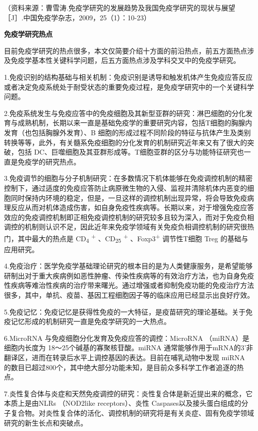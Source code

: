 （资料来源：曹雪涛.免疫学研究的发展趋势及我国免疫学研究的现状与展望［J］.中国免疫学杂志，2009，25（1）：10-23）

\begin{center}
    \textbf{\Large  免疫学研究热点}
\end{center}

目前免疫学研究的热点很多，本文仅简要介绍十方面的前沿热点，前五方面热点涉及免疫学基本性关键科学问题，后五方面热点涉及学科交叉中的免疫学研究。

1.免疫识别的结构基础与相关机制：免疫识别是诱导和触发机体产生免疫应答反应或者决定免疫系统处于耐受状态的重要免疫过程，是免疫学研究中的一个关键科学问题。

2.免疫系统发生与免疫应答中的免疫细胞及其新型亚群的研究：淋巴细胞的分化发育与成熟机制，长期以来一直是基础免疫学的重要研究内容，包括T细胞的胸腺内发育（也包括胸腺外发育）、B
细胞的形成过程不同阶段的特征与抗体产生及类别转换等等，此外，有关髓系免疫细胞的分化发育的机制研究近年来又有了很大的突破，包括
DC、巨噬细胞及其亚群形成等。T细胞亚群的区分与功能特征研究也一直是免疫学的研究热点。

3.免疫调节的细胞与分子机制研究：在多数情况下机体能够在免疫调控机制的精密控制下，通过适度的免疫应答防止病原微生物的入侵、监视并清除机体内恶变的细胞同时保持内环境的稳定，但是，一旦这样的调控机制出现异常，将会导致免疫病理反应从而对机体造成伤害，如自身免疫性疾病等。长期以来，对于增强免疫应答效应的免疫调控机制即正相免疫调控机制的研究较多且较为深入，而对于免疫负相调控的机制则认识不足，因此近年来免疫学领域有关免疫负相调控机制的研究很热门，其中最大的热点是
CD\textsubscript{4} \textsuperscript{+} 、CD\textsubscript{25}
\textsuperscript{+} 、Foxp3\textsuperscript{+} 调节性T细胞 Treg
的基础与应用研究。

4.免疫治疗：医学免疫学基础理论研究的根本目的是为人类健康服务，是希望能够研制出对于重大疾病例如恶性肿瘤、传染性疾病等的有效治疗方法，也为自身免疫性疾病等难治性疾病的治疗带来曙光。通过增强或者抑制免疫功能的免疫治疗方法很多，其中，单抗、疫苗、基因工程细胞因子等的临床应用已经显示出良好疗效。

5.免疫记忆：免疫记忆是获得性免疫的一大特征，是疫苗研究的理论基础。关于免疫记忆形成的机制研究一直是免疫学研究的一大热点。

6.MicroRNA 与免疫细胞分化发育及免疫应答的调控：MicroRNA
（miRNA）是细胞内长度为 18～25个碱基的寡聚核苷酸。miRNA
通常能够作用于mRNA的3'非翻译区，进而在转录后水平上调控基因的表达。目前在哺乳动物中发现
miRNA
的数目已超过800个，其中绝大部分功能未知，是目前众多科学工作者追逐的热点。

7.炎性复合体与炎症和天然免疫调控的研究：炎性复合体是新近提出来的概念，它本质上是由NLRs
（NOD2like receptors）、炎性
Caspases以及接头蛋白组成的分子复合物。对炎性复合体的活化、调控机制的研究将是有关炎症、固有免疫学领域研究的新生长点和突破点。

